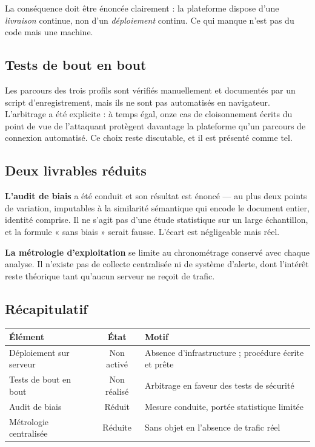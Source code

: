 \documentclass[11pt,a4paper]{article}
\begin{document}
La conséquence doit être énoncée clairement : la plateforme dispose d'une \emph{livraison} continue, non d'un \emph{déploiement} continu. Ce qui manque n'est pas du code mais une machine.

\subsection{Tests de bout en bout}
Les parcours des trois profils sont vérifiés manuellement et documentés par un script d'enregistrement, mais ils ne sont pas automatisés en navigateur. L'arbitrage a été explicite : à temps égal, onze cas de cloisonnement écrits du point de vue de l'attaquant protègent davantage la plateforme qu'un parcours de connexion automatisé. Ce choix reste discutable, et il est présenté comme tel.

\subsection{Deux livrables réduits}
\textbf{L'audit de biais} a été conduit et son résultat est énoncé --- au plus deux points de variation, imputables à la similarité sémantique qui encode le document entier, identité comprise. Il ne s'agit pas d'une étude statistique sur un large échantillon, et la formule « sans biais » serait fausse. L'écart est négligeable mais réel.

\textbf{La métrologie d'exploitation} se limite au chronométrage conservé avec chaque analyse. Il n'existe pas de collecte centralisée ni de système d'alerte, dont l'intérêt reste théorique tant qu'aucun serveur ne reçoit de trafic.

\subsection{Récapitulatif}
\begin{center}
\small
\begin{tabular}{lcp{7.4cm}}
  \toprule
  \textbf{Élément} & \textbf{État} & \textbf{Motif} \\
  \midrule
  Déploiement sur serveur & \textcolor{ambre}{Non activé} & Absence d'infrastructure ; procédure écrite et prête \\[1mm]
  Tests de bout en bout & \textcolor{ambre}{Non réalisé} & Arbitrage en faveur des tests de sécurité \\[1mm]
  Audit de biais & \textcolor{accent}{Réduit} & Mesure conduite, portée statistique limitée \\[1mm]
  Métrologie centralisée & \textcolor{accent}{Réduite} & Sans objet en l'absence de trafic réel \\
  \bottomrule
\end{tabular}
\end{center}
\end{document}
